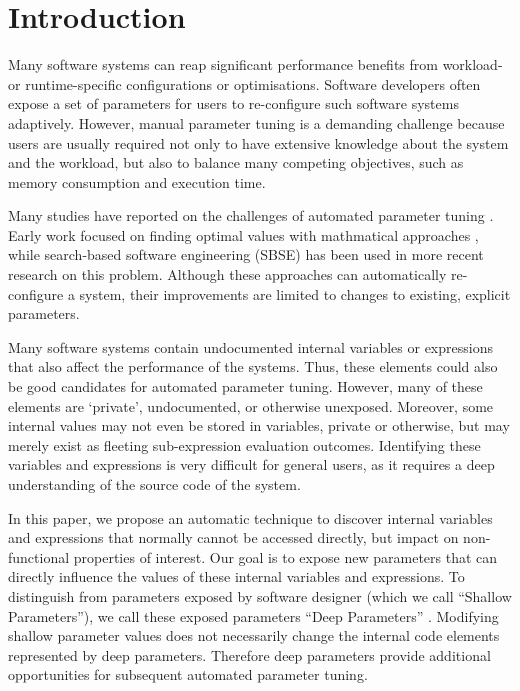 
\section{Introduction}

Many software systems can reap significant performance benefits from
workload- or runtime-specific configurations or optimisations.
Software developers often expose a set of parameters for users to re-configure such software systems adaptively.
However, manual parameter tuning is a demanding challenge because users are usually required not only to have extensive knowledge about the system and the workload, but also to balance many competing objectives, such as memory consumption and execution time.

Many studies have reported on the challenges of automated parameter tuning \cite{Hoffmann:2011:DKR:1950365.1950390, Vuduc01statisticalmodels,autotuning,Whaley:1998:ATL:509058.509096,Tapus:2002:AHT:762761.762771, hutter2009paramils,arcuri-ssbse-2011}. Early work focused on finding optimal values with mathmatical approaches \cite{Vuduc01statisticalmodels,autotuning,Whaley:1998:ATL:509058.509096,Tapus:2002:AHT:762761.762771}, while search-based software engineering (SBSE) \cite{Harman:2007:CSF:1253532.1254729} has been used in more recent research \cite{hutter2009paramils,arcuri-ssbse-2011, Hoffmann:2011:DKR:1950365.1950390} on this problem. Although these approaches can automatically re-configure a system, their improvements are limited to changes to existing, explicit parameters.


Many software systems contain undocumented internal variables or
expressions that also affect the performance of the systems. Thus, these
elements could also be good candidates for automated parameter tuning.
However, many of these elements are `private', undocumented, or otherwise
unexposed.
Moreover, some internal values may
not even be stored in variables, private or otherwise, but may merely exist
as fleeting sub-expression evaluation outcomes. Identifying these variables
and expressions is very difficult for general users, as it requires a deep
understanding of the source code of the system. 


In this paper, we propose an automatic technique to discover internal variables and expressions that normally cannot be accessed directly, but impact on non-functional properties of interest. Our goal is to expose new parameters that can directly influence the values of these internal variables and expressions. To distinguish from parameters exposed by software designer (which we call ``Shallow Parameters''), we call these exposed parameters ``Deep Parameters'' \cite{Harman:2014:GIA:2593929.2600116}. Modifying shallow parameter values does not necessarily change the internal code elements represented by deep parameters. Therefore deep parameters provide additional opportunities for subsequent automated parameter tuning.


